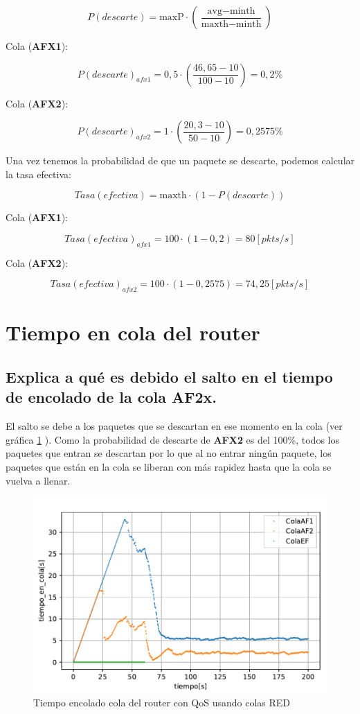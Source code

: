 \[
P(descarte) = \text{maxP} \cdot \left(\frac{\text{avg} - \text{minth}}{\text{maxth} - \text{minth}}\right)
\]

Cola (\textbf{AFX1}):

\[
P(descarte)_{afx1} = 0,5 \cdot \left(\frac{46,65 - 10}{100 - 10}\right) = 0,2\%
\]

Cola (\textbf{AFX2}):

\[
P(descarte)_{afx2} = 1 \cdot \left(\frac{20,3 - 10}{50 - 10}\right) = 0,2575\%
\]

Una vez tenemos la probabilidad de que un paquete se descarte, podemos calcular la tasa efectiva:

\[
Tasa(efectiva) = \text{maxth} \cdot (1 - P(descarte))
\]

Cola (\textbf{AFX1}): 

\[
Tasa(efectiva)_{afx1} = 100 \cdot (1 - 0,2) = 80 [pkts/s]
\]

Cola (\textbf{AFX2}):

\[
Tasa(efectiva)_{afx2} = 100 \cdot (1 - 0,2575) = 74,25 [pkts/s]
\]


\section{Tiempo en cola del router}
\subsection{Explica a qué es debido el salto en el tiempo de encolado de la cola AF2x.}

El salto se debe a los paquetes que se descartan en ese momento en la cola (ver gráfica \ref{fig:colasRED_time} ). Como la probabilidad de descarte de \textbf{AFX2} 
es del 100\%, todos los paquetes que entran se descartan por lo que al no entrar ningún paquete, los paquetes que están en la cola se liberan 
con más rapidez hasta que la cola se vuelva a llenar.

\begin{figure}[!ht]
    \centering
    \includegraphics{graficas/RED/tiempo_en_cola_red.pdf}
    \caption{Tiempo encolado cola del router con QoS usando colas RED}
    \label{fig:colasRED_time}
\end{figure}

